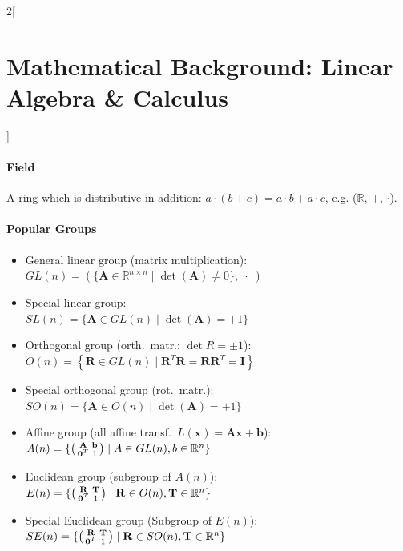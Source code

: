 \documentclass[oneside,fontsize=11pt,paper=a4]{scrartcl}
\begin{document}
\begin{multicols}{2}[\section{Mathematical Background: Linear Algebra \& Calculus}]
\paragraph{Field} A ring which is distributive in addition: $a \cdot (b + c) = a \cdot b + a \cdot c$, e.g. ($\mathbb{R}$, $+$, $\cdot$).

\paragraph{Popular Groups}
\begin{itemize}
    \setlength\itemsep{-0.1em}
    \item General linear group (matrix multiplication):\\
    $GL(n) = (\{\mathbf{A} \in \mathbb{R}^{n \times n} \; \vert \; \det(\mathbf{A}) \neq 0\}, \; \cdot \;)$
    \item Special linear group:\\
    $SL(n) = \{\mathbf{A} \in GL(n) \; \vert \; \det(\mathbf{A}) = +1\}$
    \item Orthogonal group (orth.\ matr.: $\det R = \pm1$):\\
    $O(n) = \left\{ \mathbf{R} \in GL(n) \; \vert \; \mathbf{R}^T\mathbf{R} = \mathbf{RR}^T = \mathbf{I} \right\}$
    \item Special orthogonal group (rot.\ matr.):\\
    $SO(n) = \{\mathbf{A} \in O(n) \; \vert \; \det(\mathbf{A}) = +1\}$
    \item Affine group (all affine transf.\ $L(\mathbf{x}) = \mathbf{Ax} + \mathbf{b}$):\\
    $A(n) = \{\begin{psmallmatrix} \mathbf{A} & \mathbf{b}\\ \mathbf{0}^T & 1\\ \end{psmallmatrix} \; \vert \; A \in GL(n), b \in \mathbb{R}^n\}$
    \item Euclidean group (subgroup of $A(n)$):\\
    $E(n) = \{\begin{psmallmatrix} \mathbf{R} & \mathbf{T}\\ \mathbf{0}^T & 1\\ \end{psmallmatrix} \; \vert \; \mathbf{R} \in O(n), \mathbf{T} \in \mathbb{R}^n\}$
    \item Special Euclidean group (Subgroup of $E(n)$):\\
    $SE(n) = \{\begin{psmallmatrix} \mathbf{R} & \mathbf{T}\\ \mathbf{0}^T & 1\\ \end{psmallmatrix} \; \vert \; \mathbf{R} \in SO(n), \mathbf{T} \in \mathbb{R}^n\}$\\

\end{itemize}
\end{multicols}
\end{document}
